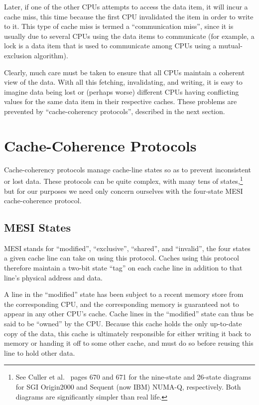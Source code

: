 Later, if one of the other CPUs attempts to access the data item, it
will incur a cache miss, this time because the first CPU invalidated
the item in order to write to it.
This type of cache miss is termed a ``communication miss'', since it
is usually due to several CPUs using the data items to communicate
(for example, a lock is a data item that is used to communicate among
CPUs using a mutual-exclusion algorithm).

Clearly, much care must be taken to ensure that all CPUs maintain
a coherent view of the data.
With all this fetching, invalidating, and writing, it is easy to
imagine data being lost or (perhaps worse) different CPUs having
conflicting values for the same data item in their respective
caches.
These problems are prevented by ``cache-coherency protocols'',
described in the next section.

\section{Cache-Coherence Protocols}
\label{sec:app:whymb:Cache-Coherence Protocols}

Cache-coherency protocols manage cache-line states so as to prevent
inconsistent or lost data.
These protocols can be quite complex, with many tens
of states,\footnote{
	See Culler et al.~\cite{DavidECuller1999} pages 670 and 671
	for the nine-state and 26-state diagrams for SGI Origin2000
	and Sequent (now IBM) NUMA-Q, respectively.
	Both diagrams are significantly simpler than real life.}
but for our purposes we need only concern ourselves with the
four-state MESI cache-coherence protocol.

\subsection{MESI States}
\label{sec:app:whymb:MESI States}

MESI stands for ``modified'', ``exclusive'', ``shared'', and ``invalid'',
the four states a given cache line can take on using this
protocol.
Caches using this protocol therefore maintain a two-bit state ``tag'' on each
cache line in addition to that line's physical address and data.

A line in the ``modified'' state has been subject to a recent memory store
from the corresponding CPU, and the corresponding memory is guaranteed
not to appear in any other CPU's cache.
Cache lines in the ``modified'' state can thus be said to be ``owned''
by the CPU.
Because this cache holds the only up-to-date copy of the data, this
cache is ultimately responsible for either writing it back to memory
or handing it off to some other cache, and must do so before reusing
this line to hold other data.

